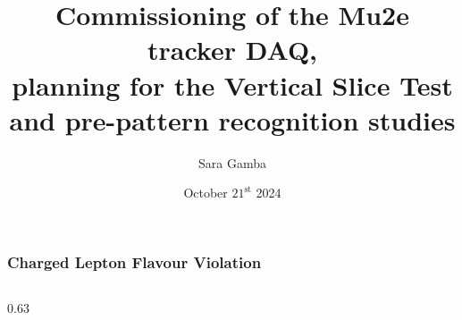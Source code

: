 \documentclass{beamer}
\title[Titolo breve]{Commissioning of the Mu2e tracker DAQ,\\ \vspace{1mm}planning for the Vertical Slice Test\\\vspace{1mm}and pre-pattern recognition studies}
\institute{Universita di Pisa}
\author[Sara Gamba]{\small{Sara Gamba}}
\date[21/10/24]{\small{October $21^{\text{st}}$ 2024}}
\begin{document}
	
\begin{frame}
\setTitlestyleDissertation
\maketitle
\end{frame}


\begin{frame}
    \frametitle{Charged Lepton Flavour Violation}
    \vspace{-2mm}
\begin{columns}
    \begin{column}{0.63\framewidth}
        \setlength{\leftmargini}{1.3em}


\end{column}
\end{columns}
\end{frame}
\end{document}
